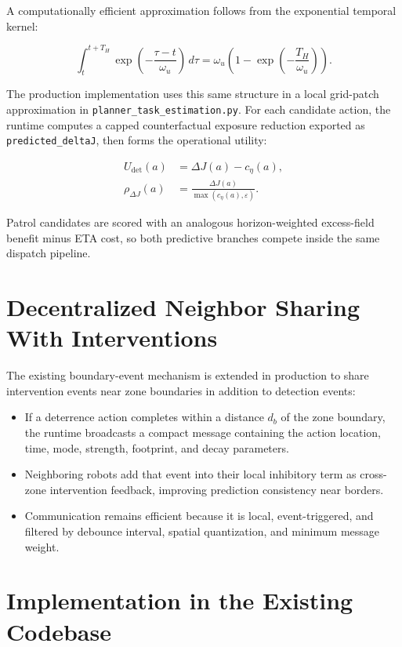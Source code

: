 A computationally efficient approximation follows from the exponential temporal kernel:

\begin{equation}
\int_t^{t+T_H}
\exp\!\left(-\frac{\tau-t}{\omega_u}\right)\,d\tau
=
\omega_u\left(1-\exp\!\left(-\frac{T_H}{\omega_u}\right)\right).
\end{equation}

The production implementation uses this same structure in a local grid-patch approximation in \texttt{planner\_task\_estimation.py}. For each candidate action, the runtime computes a capped counterfactual exposure reduction exported as \texttt{predicted\_deltaJ}, then forms the operational utility:

\begin{align}
U_{\mathrm{det}}(a) &= \Delta J(a) - c_{\eta}(a), \\
\rho_{\Delta J}(a) &= \frac{\Delta J(a)}{\max(c_{\eta}(a),\varepsilon)}.
\end{align}

Patrol candidates are scored with an analogous horizon-weighted excess-field benefit minus ETA cost, so both predictive branches compete inside the same dispatch pipeline.

\section{Decentralized Neighbor Sharing With Interventions}

The existing boundary-event mechanism is extended in production to share intervention events near zone boundaries in addition to detection events:

\begin{itemize}
\item If a deterrence action completes within a distance $d_b$ of the zone boundary, the runtime broadcasts a compact message containing the action location, time, mode, strength, footprint, and decay parameters.
\item Neighboring robots add that event into their local inhibitory term as cross-zone intervention feedback, improving prediction consistency near borders.
\item Communication remains efficient because it is local, event-triggered, and filtered by debounce interval, spatial quantization, and minimum message weight.
\end{itemize}

\section{Implementation in the Existing Codebase}

